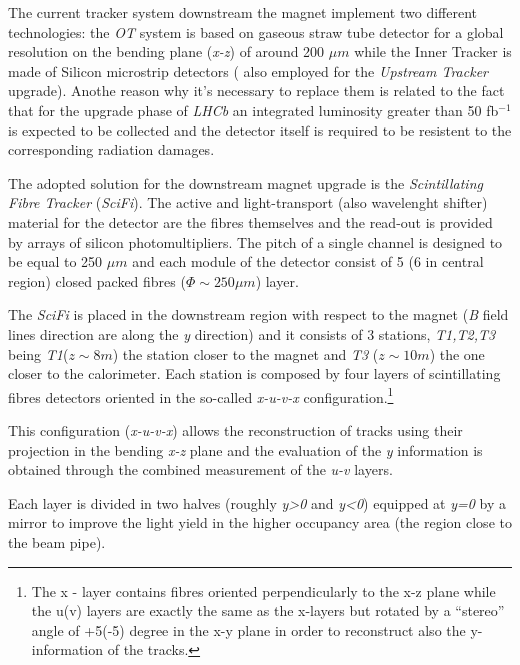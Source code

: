 \documentclass[paper=a4, fontsize=10pt]{scrartcl}
\numberwithin{equation}{section}		%
\numberwithin{figure}{section}			%
\numberwithin{table}{section}				%
\begin{document}
The current tracker system downstream the magnet implement two different technologies: the \textit{OT} system is based on gaseous straw tube detector for a global resolution on the bending plane (\textit{x-z}) of around 200 $\mu m$ while the Inner Tracker is made of Silicon microstrip detectors ( also employed for the \textit{Upstream Tracker} upgrade).
Anothe reason why it's necessary to replace them is related to the fact that for the upgrade phase of \textit{LHCb} an integrated luminosity greater than 50 fb$^{-1}$ is expected to be collected and the detector itself is required to be resistent to the corresponding radiation damages.

The adopted solution for the downstream magnet upgrade is the \textit{Scintillating Fibre Tracker} (\textit{SciFi}). The active and light-transport (also wavelenght shifter) material for the detector are the fibres themselves and the read-out is provided by arrays of silicon photomultipliers. The pitch of a single channel is designed to be equal to 250 $\mu m$ and each module of the detector consist of 5 (6 in central region) closed packed fibres ($\Phi \sim 250 \mu m$) layer.

 
The \textit{SciFi} is placed in the downstream region with respect to the magnet (\textit{B} field lines direction are along the \textit{y} direction) and it consists of 3 stations, \textit{T1,T2,T3} being \textit{T1}($z\sim 8m$) the station closer to the magnet and \textit{T3} ($z\sim 10m$) the one closer to the calorimeter. Each station is composed by four layers of scintillating fibres detectors oriented in the so-called \textit{x-u-v-x} configuration.\footnote{The x - layer contains fibres oriented perpendicularly to the x-z plane while the u(v) layers are exactly the same as the x-layers but rotated by a ``stereo'' angle of +5(-5) degree in the x-y plane in order to reconstruct also the y-information of the tracks.}

This configuration (\textit{x-u-v-x}) allows the reconstruction of tracks using their projection in the bending \textit{x-z} plane and the evaluation of the \textit{y} information is obtained through the combined measurement of the \textit{u-v} layers. 

Each layer is divided in two halves (roughly \textit{y>0} and \textit{y<0}) equipped at \textit{y=0} by a mirror to improve the light yield in the higher occupancy area (the region close to the beam pipe).
\end{document}
